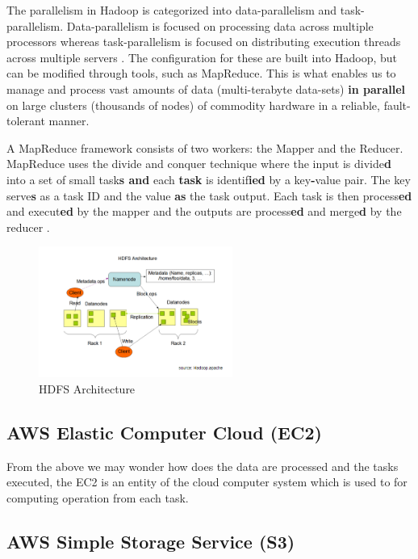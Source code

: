 \documentclass[journal]{IEEEtran}
\begin{document}
	The parallelism in Hadoop is categorized into data-parallelism and task-parallelism.
	Data-parallelism is focused on processing data across multiple processors whereas
	task-parallelism is focused on distributing execution threads across multiple servers
	\cite{Parallelism}. The configuration for these are built into Hadoop, but can be modified through tools, such as MapReduce. This is what enables us to manage and process vast
	amounts of data (multi-terabyte data-sets) \textbf{in parallel} on large clusters (thousands of nodes) of 
	commodity hardware in a	reliable, fault-tolerant manner.
	
	A MapReduce framework consists of two workers: the Mapper and the Reducer. MapReduce uses the divide and conquer \cite{Divide-and-Conquer} technique where the input is divide\textbf{d} into a set of small task\textbf{s and} each \textbf{task} is identif\textbf{ied} by a key\textbf{-}value pair. The key serve\textbf{s} as a task ID and the value \textbf{as} the task output. Each task is then process\textbf{ed} and execut\textbf{ed} by the mapper and the outputs are process\textbf{ed} and merge\textbf{d} by the reducer \cite{MapReduce}.
	
	\begin{figure}
		\centering
		\includegraphics[width=2.5in]{HDFS_Arch.png}
		\caption{HDFS Architecture}
		\label{HDFS}
	\end{figure}
	
	\subsection{AWS Elastic Computer Cloud (EC2)}
	
	From the above we may wonder how does the data are processed and the tasks executed, the EC2 is an entity of the cloud computer system which is used to for computing operation from each task.
	
	\subsection{AWS Simple Storage Service (S3)}
	
\end{document}
